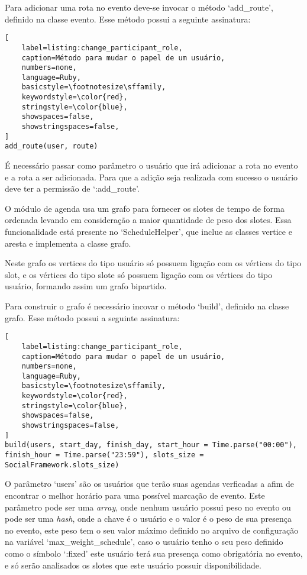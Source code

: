 Para adicionar uma rota no evento deve-se invocar o método `add\_route', definido na classe evento. Esse método possui a seguinte assinatura:

\begin{lstlisting}[
    label=listing:change_participant_role,
    caption=Método para mudar o papel de um usuário,
    numbers=none,
    language=Ruby,
    basicstyle=\footnotesize\sffamily,
    keywordstyle=\color{red},
    stringstyle=\color{blue},
    showspaces=false,
    showstringspaces=false,
]
add_route(user, route)
\end{lstlisting}

É necessário passar como parâmetro o usuário que irá adicionar a rota no evento e a rota a ser adicionada. Para que a adição seja realizada com sucesso o usuário deve ter a permissão de `:add\_route'.

O módulo de agenda usa um grafo para fornecer os slotes de tempo de forma ordenada levando em consideração a maior quantidade de peso dos slotes. Essa funcionalidade está presente no `ScheduleHelper', que inclue as classes vertice e aresta e implementa a classe grafo.

Neste grafo os vertices do tipo usuário só possuem ligação com os vértices do tipo slot, e os vértices do tipo slote só possuem ligação com os vértices do tipo usuário, formando assim um grafo bipartido.

Para construir o grafo é necessário incovar o método `build', definido na classe grafo. Esse método possui a seguinte assinatura:

\begin{lstlisting}[
    label=listing:change_participant_role,
    caption=Método para mudar o papel de um usuário,
    numbers=none,
    language=Ruby,
    basicstyle=\footnotesize\sffamily,
    keywordstyle=\color{red},
    stringstyle=\color{blue},
    showspaces=false,
    showstringspaces=false,
]
build(users, start_day, finish_day, start_hour = Time.parse("00:00"), finish_hour = Time.parse("23:59"), slots_size = SocialFramework.slots_size)
\end{lstlisting}

O parâmetro `users' são os usuários que terão suas agendas verficadas a afim de encontrar o melhor horário para uma possível marcação de evento. Este parâmetro pode ser uma \textit{array}, onde nenhum usuário possui peso no evento ou pode ser uma \textit{hash}, onde a chave é o usuário e o valor é o peso de sua presença no evento, este peso tem o seu valor máximo definido no arquivo de configuração na variável `max\_weight\_schedule', caso o usuário tenho o seu peso definido como o símbolo `:fixed' este usuário terá sua presença como obrigatória no evento, e só serão analisados os slotes que este usuário possuir disponibilidade.


